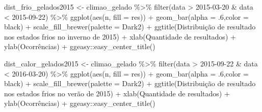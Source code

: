 \documentclass[
]{article}
\newenvironment{Shaded}{\begin{snugshade}}{\end{snugshade}}
\newcommand{\AttributeTok}[1]{\textcolor[rgb]{0.77,0.63,0.00}{#1}}
\newcommand{\DecValTok}[1]{\textcolor[rgb]{0.00,0.00,0.81}{#1}}
\newcommand{\FunctionTok}[1]{\textcolor[rgb]{0.00,0.00,0.00}{#1}}
\newcommand{\NormalTok}[1]{#1}
\newcommand{\OtherTok}[1]{\textcolor[rgb]{0.56,0.35,0.01}{#1}}
\newcommand{\SpecialCharTok}[1]{\textcolor[rgb]{0.00,0.00,0.00}{#1}}
\newcommand{\StringTok}[1]{\textcolor[rgb]{0.31,0.60,0.02}{#1}}
\begin{document}
\begin{Shaded}
\begin{Highlighting}[]
\NormalTok{dist\_frio\_gelados2015 }\OtherTok{\textless{}{-}}\NormalTok{ climao\_gelado }\SpecialCharTok{\%\textgreater{}\%} 
  \FunctionTok{filter}\NormalTok{(data }\SpecialCharTok{\textgreater{}} \StringTok{\textquotesingle{}2015{-}03{-}20\textquotesingle{}} \SpecialCharTok{\&}\NormalTok{ data }\SpecialCharTok{\textless{}} \StringTok{\textquotesingle{}2015{-}09{-}22\textquotesingle{}}\NormalTok{) }\SpecialCharTok{\%\textgreater{}\%}
  \FunctionTok{ggplot}\NormalTok{(}\FunctionTok{aes}\NormalTok{(n, }\AttributeTok{fill =}\NormalTok{ res)) }\SpecialCharTok{+} 
  \FunctionTok{geom\_bar}\NormalTok{(}\AttributeTok{alpha =}\NormalTok{ .}\DecValTok{6}\NormalTok{,}\AttributeTok{color =} \StringTok{\textquotesingle{}black\textquotesingle{}}\NormalTok{) }\SpecialCharTok{+} 
  \FunctionTok{scale\_fill\_brewer}\NormalTok{(}\AttributeTok{palette =} \StringTok{\textquotesingle{}Dark2\textquotesingle{}}\NormalTok{) }\SpecialCharTok{+}
  \FunctionTok{ggtitle}\NormalTok{(}\StringTok{\textquotesingle{}Distribuição de resultado nos estados frios no inverno de 2015\textquotesingle{}}\NormalTok{) }\SpecialCharTok{+}
  \FunctionTok{xlab}\NormalTok{(}\StringTok{\textquotesingle{}Quantidade de resultados\textquotesingle{}}\NormalTok{) }\SpecialCharTok{+} \FunctionTok{ylab}\NormalTok{(}\StringTok{\textquotesingle{}Ocorrências\textquotesingle{}}\NormalTok{) }\SpecialCharTok{+}
\NormalTok{  ggeasy}\SpecialCharTok{::}\FunctionTok{easy\_center\_title}\NormalTok{()}

\NormalTok{dist\_calor\_gelados2015 }\OtherTok{\textless{}{-}}\NormalTok{ climao\_gelado }\SpecialCharTok{\%\textgreater{}\%} 
  \FunctionTok{filter}\NormalTok{(data }\SpecialCharTok{\textgreater{}} \StringTok{\textquotesingle{}2015{-}09{-}22\textquotesingle{}} \SpecialCharTok{\&}\NormalTok{ data }\SpecialCharTok{\textless{}} \StringTok{\textquotesingle{}2016{-}03{-}20\textquotesingle{}}\NormalTok{) }\SpecialCharTok{\%\textgreater{}\%}
  \FunctionTok{ggplot}\NormalTok{(}\FunctionTok{aes}\NormalTok{(n, }\AttributeTok{fill =}\NormalTok{ res)) }\SpecialCharTok{+} 
  \FunctionTok{geom\_bar}\NormalTok{(}\AttributeTok{alpha =}\NormalTok{ .}\DecValTok{6}\NormalTok{,}\AttributeTok{color =} \StringTok{\textquotesingle{}black\textquotesingle{}}\NormalTok{) }\SpecialCharTok{+} 
  \FunctionTok{scale\_fill\_brewer}\NormalTok{(}\AttributeTok{palette =} \StringTok{\textquotesingle{}Dark2\textquotesingle{}}\NormalTok{) }\SpecialCharTok{+}
  \FunctionTok{ggtitle}\NormalTok{(}\StringTok{\textquotesingle{}Distribuição de resultado nos estados frios no verão de 2015\textquotesingle{}}\NormalTok{) }\SpecialCharTok{+}
  \FunctionTok{xlab}\NormalTok{(}\StringTok{\textquotesingle{}Quantidade de resultados\textquotesingle{}}\NormalTok{) }\SpecialCharTok{+} \FunctionTok{ylab}\NormalTok{(}\StringTok{\textquotesingle{}Ocorrências\textquotesingle{}}\NormalTok{) }\SpecialCharTok{+}
\NormalTok{  ggeasy}\SpecialCharTok{::}\FunctionTok{easy\_center\_title}\NormalTok{()}



\end{Highlighting}
\end{Shaded}
\end{document}
